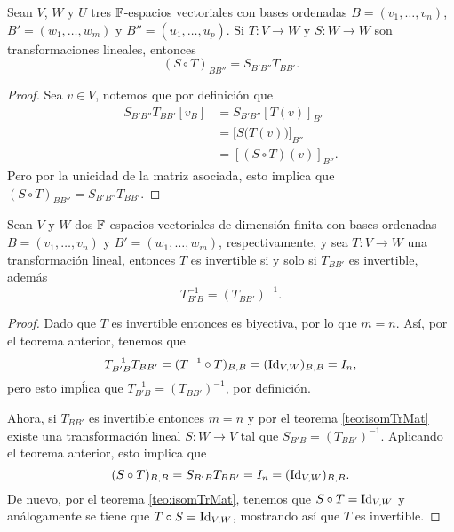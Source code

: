 \begin{teor}
  Sean $V$, $W$ y $U$ tres $\mathbb{F}$-espacios vectoriales con bases ordenadas $B = (v_1,\ldots,v_n)$, $B' = (w_1,\ldots,w_m)$ y $B'' = (u_1,\ldots,u_p)$. Si $T\colon V \to W$ y $S\colon W \to W$ son transformaciones lineales, entonces
  \[ (S \circ T)_{BB''} = S_{B'B''} T_{BB'}. \]
\end{teor}
\begin{proof}
  Sea $v \in V$, notemos que por definición que
    \begin{align*}
      S_{B'B''} T_{BB'}[v_B] &= S_{B'B''}[T(v)]_{B'} \\
        &= \bigl[ S\bigl(T(v)\bigr) \bigr]_{B''} \\
        &= [(S\circ T)(v)]_{B''}.
    \end{align*}
  Pero por la unicidad de la matriz asociada, esto implica que $(S \circ T)_{BB''} = S_{B'B''} T_{BB'}$.
\end{proof}

\begin{coro}
  Sean $V$ y $W$ dos $\mathbb{F}$-espacios vectoriales de dimensión finita con bases ordenadas $B = (v_1,\ldots,v_n)$ y $B' = (w_1,\ldots,w_m)$, respectivamente, y sea $T\colon V \to W$ una transformación lineal, entonces $T$ es invertible si y solo si $T_{BB'}$ es invertible, además
    \[ T_{B'B}^{-1} = (T_{BB'})^{-1}. \]
\end{coro}
\begin{proof}
  Dado que $T$ es invertible entonces es biyectiva, por lo que $m = n$. Así, por el teorema anterior, tenemos que
  \[ T^{-1}_{B'B} T_{BB'} = (T^{-1}\circ T)_{B,B} = (\mathrm{Id}_{V,W})_{B,B} = I_n, \]
  pero esto impĺica que $T_{B'B}^{-1} = (T_{BB'})^{-1}$, por definición.

  Ahora, si $T_{BB'}$ es invertible entonces $m = n$ y por el teorema \ref{teo:isomTrMat} existe una transformación lineal $S\colon W \to V$ tal que $S_{B'B} =  (T_{BB'})^{-1}$. Aplicando el teorema anterior, esto implica que
    \[ (S \circ T)_{B,B} =  S_{B'B}T_{BB'} = I_n = (\mathrm{Id}_{V,W})_{B,B}. \]
  De nuevo, por el teorema \ref{teo:isomTrMat}, tenemos que $S \circ T = \mathrm{Id}_{V,W}$ y análogamente se tiene que $T \circ S = \mathrm{Id}_{V,W}$, mostrando así que $T$ es invertible.
\end{proof}


\ExerciseSection

